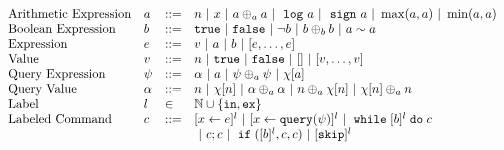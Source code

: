 \[
\begin{array}{llll}
%
\mbox{Arithmetic Expression} 
& \aexpr & ::= & 
n ~|~ {x} ~|~ \aexpr \oplus_a \aexpr 
~|~ \elog \aexpr ~|~ \esign \aexpr ~|~ \max(a, a) ~|~ \min(a, a)
\\
%
\mbox{Boolean Expression} & \bexpr & ::= & 
%
\etrue ~|~ \efalse ~|~ \neg \bexpr
 ~|~ \bexpr \oplus_b \bexpr
%
~|~ \aexpr \sim \aexpr 
\\
%
\mbox{Expression} & \expr & ::= & v ~|~ \aexpr ~|~ \bexpr ~|~ [\expr, \dots, \expr]
\\ 
%
\mbox{Value} 
& v & ::= & { n ~|~ \etrue ~|~ \efalse ~|~ [] ~|~ [v, \dots, v]} 
\\
%
\mbox{Query Expression} 
& {\qexpr} & ::= 
& { \qval ~|~ \aexpr ~|~ \qexpr \oplus_a \qexpr ~|~ \chi[\aexpr]} 
\\
%
\mbox{Query Value} & \qval & ::= 
& {n ~|~ \chi[n] ~|~ \qval \oplus_a \qval ~|~ n \oplus_a \chi[n]
 ~|~ \chi[n] \oplus_a n}\\
\mbox{Label} 
& l & \in & \mathbb{N} \cup \{\lin, \lex\} \\
\mbox{Labeled Command} 
& {c} & ::= & [\assign {{x}}{ {\expr}}]^{l} ~|~ [\assign {{x} } {{\query(\qexpr)}}]^{l}
~|~ {\ewhile [ \bexpr ]^{l} \edo {c} }
 \\
 &&&
~|~ {c};{c} 
~|~ \eif([\bexpr]{}^l , {c}, {c}) 
~|~ [\eskip]^l 

\end{array}\]
